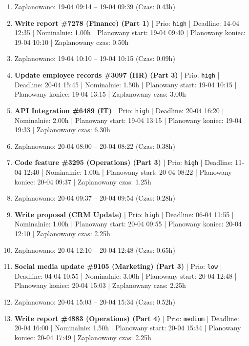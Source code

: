 {\begin{enumerate}
  \item [\textbf{PRZERWA}] Zaplanowano: 19-04 09:14 -- 19-04 09:39 (Czas: 0.43h)
  \item [\textbf{14609}] \textbf{Write report \#7278 (Finance) (Part 1)} | Prio: \texttt{high} | Deadline: 14-04 12:35 | Nominalnie: 1.00h | Planowany start: 19-04 09:40 | Planowany koniec: 19-04 10:10 | Zaplanowany czas: 0.50h
  \item [\textbf{PRZERWA}] Zaplanowano: 19-04 10:10 -- 19-04 10:15 (Czas: 0.09h)
  \item [\textbf{14621}] \textbf{Update employee records \#3097 (HR) (Part 3)} | Prio: \texttt{high} | Deadline: 20-04 15:45 | Nominalnie: 1.50h | Planowany start: 19-04 10:15 | Planowany koniec: 19-04 13:15 | Zaplanowany czas: 3.00h
  \item [\textbf{14620}] \textbf{API Integration \#6489 (IT)} | Prio: \texttt{high} | Deadline: 20-04 16:20 | Nominalnie: 2.00h | Planowany start: 19-04 13:15 | Planowany koniec: 19-04 19:33 | Zaplanowany czas: 6.30h
  \item [\textbf{PRZERWA}] Zaplanowano: 20-04 08:00 -- 20-04 08:22 (Czas: 0.38h)
  \item [\textbf{14608}] \textbf{Code feature \#3295 (Operations) (Part 3)} | Prio: \texttt{high} | Deadline: 11-04 12:40 | Nominalnie: 1.00h | Planowany start: 20-04 08:22 | Planowany koniec: 20-04 09:37 | Zaplanowany czas: 1.25h
  \item [\textbf{PRZERWA}] Zaplanowano: 20-04 09:37 -- 20-04 09:54 (Czas: 0.28h)
  \item [\textbf{14629}] \textbf{Write proposal (CRM Update)} | Prio: \texttt{high} | Deadline: 06-04 11:55 | Nominalnie: 1.00h | Planowany start: 20-04 09:55 | Planowany koniec: 20-04 12:10 | Zaplanowany czas: 2.25h
  \item [\textbf{PRZERWA}] Zaplanowano: 20-04 12:10 -- 20-04 12:48 (Czas: 0.65h)
  \item [\textbf{14698}] \textbf{Social media update \#9105 (Marketing) (Part 3)} | Prio: \texttt{low} | Deadline: 04-04 10:55 | Nominalnie: 3.00h | Planowany start: 20-04 12:48 | Planowany koniec: 20-04 15:03 | Zaplanowany czas: 2.25h
  \item [\textbf{PRZERWA}] Zaplanowano: 20-04 15:03 -- 20-04 15:34 (Czas: 0.52h)
  \item [\textbf{14651}] \textbf{Write report \#4883 (Operations) (Part 4)} | Prio: \texttt{medium} | Deadline: 20-04 16:00 | Nominalnie: 1.50h | Planowany start: 20-04 15:34 | Planowany koniec: 20-04 17:49 | Zaplanowany czas: 2.25h

\end{enumerate}}
